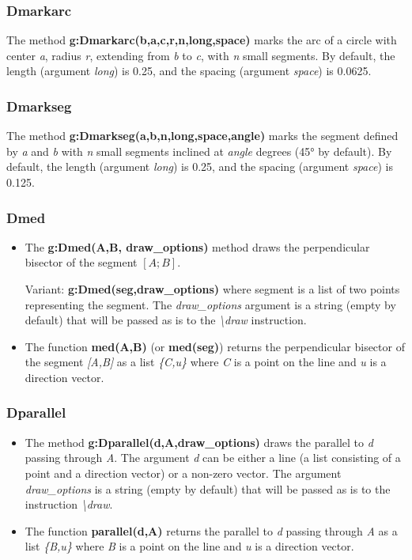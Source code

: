 \subsubsection{Dmarkarc}
The method \textbf{g:Dmarkarc(b,a,c,r,n,long,space)} marks the arc of a circle with center \emph{a}, radius \emph{r}, extending from \emph{b} to \emph{c}, with \emph{n} small segments. By default, the length (argument \emph{long}) is 0.25, and the spacing (argument \emph{space}) is 0.0625.

\subsubsection{Dmarkseg}
The method \textbf{g:Dmarkseg(a,b,n,long,space,angle)} marks the segment defined by \emph{a} and \emph{b} with \emph{n} small segments inclined at \emph{angle} degrees (45° by default). By default, the length (argument \emph{long}) is 0.25, and the spacing (argument \emph{space}) is 0.125.

\subsubsection{Dmed}
\begin{itemize}
    \item The \textbf{g:Dmed(A,B, draw\_options)} method draws the perpendicular bisector of the segment $[A;B]$.

Variant: \textbf{g:Dmed(seg,draw\_options)} where segment is a list of two points representing the segment. The \emph{draw\_options} argument is a string (empty by default) that will be passed as is to the \emph{\textbackslash draw} instruction.     \item The function \textbf{med(A,B)} (or \textbf{med(seg)}) returns the perpendicular bisector of the segment \emph{{[}A,B{]}} as a list \emph{\{C,u\}} where \emph{C} is a point on the line and \emph{u} is a direction vector.
\end{itemize}

\subsubsection{Dparallel}
\begin{itemize}
    \item The method \textbf{g:Dparallel(d,A,draw\_options)} draws the parallel to \emph{d} passing through \emph{A}. The argument \emph{d} can be either a line (a list consisting of a point and a direction vector) or a non-zero vector. The argument \emph{draw\_options} is a string (empty by default) that will be passed as is to the instruction \emph{\textbackslash draw}.
    \item The function \textbf{parallel(d,A)} returns the parallel to \emph{d} passing through \emph{A} as a list \emph{\{B,u\}} where \emph{B} is a point on the line and \emph{u} is a direction vector. \end{itemize}

